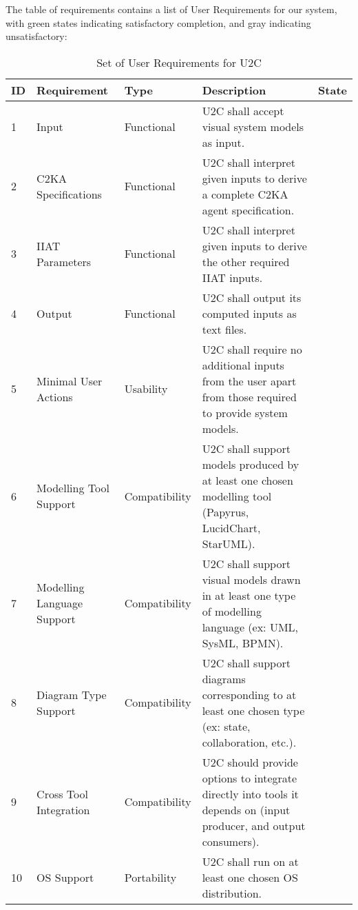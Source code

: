     The table of requirements contains a list of User Requirements for our system,
    with green states indicating satisfactory completion, and gray indicating unsatisfactory:
    \begin{longtable}{|l|p{2.6cm}|l|p{4.5cm}|c|}
        \caption{Set of User Requirements for U2C}
        \label{tab:user-reqs}
        \hline
        \textbf{ID} & \textbf{Requirement} & \textbf{Type}  & \textbf{Description} & \textbf{State}\\
        \hline
        \endhead
        \hline
        1 & Input & Functional & U2C shall accept visual system models as input. & \cellcolor{green!30}  \\
        \hline
        2 & C2KA Specifications & Functional & U2C shall interpret given inputs to derive a complete C2KA agent specification. & \cellcolor{green!30}  \\
        \hline
        3 & IIAT Parameters & Functional & U2C shall interpret given inputs to derive the other required IIAT inputs. & \cellcolor{gray!30}  \\
        \hline
        4 & Output & Functional & U2C shall output its computed inputs as text files. & \cellcolor{green!30}  \\
        \hline
        5 & Minimal User Actions & Usability & U2C shall require no additional inputs from the user apart from those required to provide system models. & \cellcolor{green!30}  \\
        \hline
        6 & Modelling Tool Support & Compatibility & U2C shall support models produced by at least one chosen modelling tool (Papyrus, LucidChart, StarUML). & \cellcolor{green!30}  \\
        \hline
        7 & Modelling Language Support & Compatibility & U2C shall support visual models drawn in at least one type of modelling language (ex: UML, SysML, BPMN). & \cellcolor{green!30}  \\
        \hline
        8 & Diagram Type Support & Compatibility & U2C shall support diagrams corresponding to at least one chosen type (ex: state, collaboration, etc.). & \cellcolor{green!30}  \\
        \hline
        9 & Cross Tool Integration & Compatibility & U2C should provide options to integrate directly into tools it depends on (input producer, and output consumers). & \cellcolor{gray!30}  \\
        \hline
        10 & OS Support & Portability & U2C shall run on at least one chosen OS distribution. & \cellcolor{green!30}  \\

\end{longtable}
